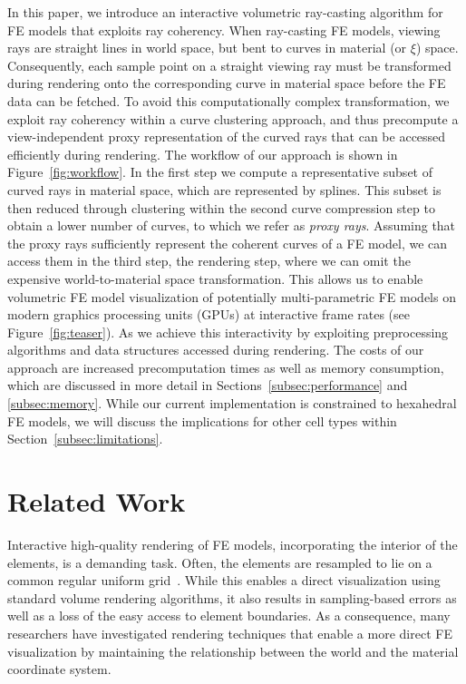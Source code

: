 \documentclass[journal]{vgtc}                %
\begin{document}
In this paper, we introduce an interactive volumetric ray-casting algorithm for FE models that exploits ray coherency. When ray-casting FE models, viewing rays are straight lines in world space, but bent to curves in material (or $\xi$) space. Consequently, each sample point on a straight viewing ray must be transformed during rendering onto the corresponding curve in material space before the FE data can be fetched. To avoid this computationally complex transformation, we exploit ray coherency within a curve clustering approach, and thus precompute a view-independent proxy representation of the curved rays that can be accessed efficiently during rendering. The workflow of our approach is shown in Figure~\ref{fig:workflow}. In the first step we compute a representative subset of curved rays in material space, which are represented by splines. This subset is then reduced through clustering within the second curve compression step to obtain a lower number of curves, to which we refer as \emph{proxy rays}. Assuming that the proxy rays sufficiently represent the coherent curves of a FE model, we can access them in the third step, the rendering step, where we can omit the expensive world-to-material space transformation. This allows us to enable volumetric FE model visualization of potentially multi-parametric FE models on modern graphics processing units (GPUs) at interactive frame rates (see Figure~\ref{fig:teaser}). As we achieve this interactivity by exploiting preprocessing algorithms and data structures accessed during rendering. The costs of our approach are increased precomputation times as well as memory consumption, which are discussed in more detail in Sections~\ref{subsec:performance} and \ref{subsec:memory}. While our current implementation is constrained to hexahedral FE models, we will discuss the implications for other cell types within Section~\ref{subsec:limitations}.
%
%
%
\section{Related Work}\label{sec:relatedwork}
Interactive high-quality rendering of FE models, incorporating the interior of the elements, is a demanding task. Often, the elements are resampled to lie on a common regular uniform grid~\cite{Wihelms90}. While this enables a direct visualization using standard volume rendering algorithms, it also results in sampling-based errors as well as a loss of the easy access to element boundaries. As a consequence, many researchers have investigated rendering techniques that enable a more direct FE visualization by maintaining the relationship between the world and the material coordinate system.
\end{document}

